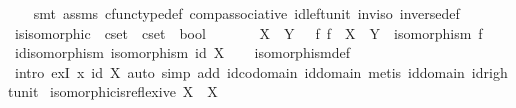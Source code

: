\begin{isabellebody}
%
\isadelimproof
\ \ %
\endisadelimproof
%
\isatagproof
{}\isamarkupfalse%
\ {\isacharparenleft}{\kern0pt}smt\ assms\ cfunc{\isacharunderscore}{\kern0pt}type{\isacharunderscore}{\kern0pt}def\ comp{\isacharunderscore}{\kern0pt}associative\ id{\isacharunderscore}{\kern0pt}left{\isacharunderscore}{\kern0pt}unit\ inv{\isacharunderscore}{\kern0pt}iso\ inverse{\isacharunderscore}{\kern0pt}def{}{\isacharparenright}{\kern0pt}%
\endisatagproof
{\isafoldproof}%
%
\isadelimproof
\isanewline
%
\endisadelimproof
\isanewline
{}\isamarkupfalse%
\ is{\isacharunderscore}{\kern0pt}isomorphic\ {\isacharcolon}{\kern0pt}{\isacharcolon}{\kern0pt}\ {\isachardoublequoteopen}cset\ {\isasymRightarrow}\ cset\ {\isasymRightarrow}\ bool{\isachardoublequoteclose}\ {\isacharparenleft}{\kern0pt}\ {\isachardoublequoteopen}{\isasymcong}{\isachardoublequoteclose}\ {}{}{\isacharparenright}{\kern0pt}\ \ \isanewline
\ \ {\isachardoublequoteopen}X\ {\isasymcong}\ Y\ {\isasymlongleftrightarrow}\ {\isacharparenleft}{\kern0pt}{\isasymexists}\ f{\isachardot}{\kern0pt}\ f\ {\isacharcolon}{\kern0pt}\ X\ {\isasymrightarrow}\ Y\ {\isasymand}\ isomorphism\ f{\isacharparenright}{\kern0pt}{\isachardoublequoteclose}\isanewline
\isanewline
{}\isamarkupfalse%
\ id{\isacharunderscore}{\kern0pt}isomorphism{\isacharcolon}{\kern0pt}\ {\isachardoublequoteopen}isomorphism\ {\isacharparenleft}{\kern0pt}id\ X{\isacharparenright}{\kern0pt}{\isachardoublequoteclose}\isanewline
%
\isadelimproof
\ \ %
\endisadelimproof
%
\isatagproof
{}\isamarkupfalse%
\ isomorphism{\isacharunderscore}{\kern0pt}def\isanewline
\ \ \isamarkupfalse%
\ {\isacharparenleft}{\kern0pt}intro\ exI{\isacharbrackleft}{\kern0pt}\ x{\isacharequal}{\kern0pt}\ {\isachardoublequoteopen}id\ X{\isachardoublequoteclose}{\isacharbrackright}{\kern0pt}{\isacharcomma}{\kern0pt}\ auto\ simp\ add{\isacharcolon}{\kern0pt}\ id{\isacharunderscore}{\kern0pt}codomain\ id{\isacharunderscore}{\kern0pt}domain{\isacharcomma}{\kern0pt}\ metis\ id{\isacharunderscore}{\kern0pt}domain\ id{\isacharunderscore}{\kern0pt}right{\isacharunderscore}{\kern0pt}unit{\isacharparenright}{\kern0pt}%
\endisatagproof
{\isafoldproof}%
%
\isadelimproof
\isanewline
%
\endisadelimproof
\isanewline
{}\isamarkupfalse%
\ isomorphic{\isacharunderscore}{\kern0pt}is{\isacharunderscore}{\kern0pt}reflexive{\isacharcolon}{\kern0pt}\ {\isachardoublequoteopen}X\ {\isasymcong}\ X{\isachardoublequoteclose}\isanewline

\end{isabellebody}
